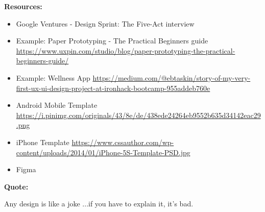 \textbf{Resources:}

\begin{itemize}
\item Google Ventures - Design Sprint: The Five-Act interview
\item Example: Paper Prototyping - The Practical Beginners guide \url{https://www.uxpin.com/studio/blog/paper-prototyping-the-practical-beginners-guide/}
\item Example: Wellness App \url{https://medium.com/@ebtaskin/story-of-my-very-first-ux-ui-design-project-at-ironhack-bootcamp-955addeb760e}
\item Android Mobile Template \url{https://i.pinimg.com/originals/43/8e/de/438ede24264eb9552b635d34142eac29.png}
\item iPhone Template \url{https://www.cssauthor.com/wp-content/uploads/2014/01/iPhone-5S-Template-PSD.jpg}
\item Figma
\end{itemize}

\textbf{Quote:}

Any design is like a joke ...if you have to explain it, it's bad.

